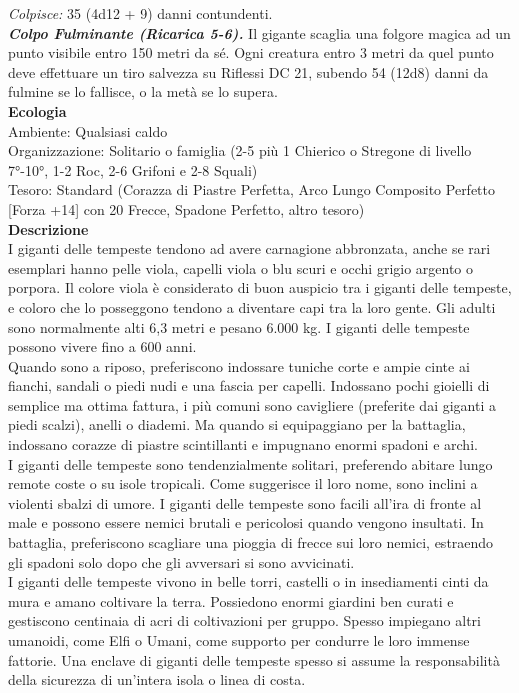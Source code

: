 \begin{multicols}{2}
\emph{Colpisce:} 35 (4d12 + 9) danni contundenti.\\
\emph{\textbf{Colpo Fulminante (Ricarica 5-6).}} Il gigante scaglia una folgore magica ad un punto visibile entro 150 metri da sé. Ogni creatura entro 3 metri da quel punto deve effettuare un tiro salvezza su Riflessi DC  21, subendo 54 (12d8) danni da fulmine se lo fallisce, o la metà se lo supera.\\
\textbf{Ecologia}\\
Ambiente: Qualsiasi caldo\\
Organizzazione: Solitario o famiglia (2-5 più 1 Chierico o Stregone di livello 7°-10°, 1-2 Roc, 2-6 Grifoni e 2-8 Squali)\\
Tesoro: Standard (Corazza di Piastre Perfetta, Arco Lungo Composito Perfetto [Forza +14] con 20 Frecce, Spadone Perfetto, altro tesoro)\\
\textbf{Descrizione}\\
I giganti delle tempeste tendono ad avere carnagione abbronzata, anche se rari esemplari hanno pelle viola, capelli viola o blu scuri e occhi grigio argento o porpora. Il colore viola è considerato di buon auspicio tra i giganti delle tempeste, e coloro che lo posseggono tendono a diventare capi tra la loro gente. Gli adulti sono normalmente alti 6,3 metri e pesano 6.000 kg. I giganti delle tempeste possono vivere fino a 600 anni.\\

Quando sono a riposo, preferiscono indossare tuniche corte e ampie cinte ai fianchi, sandali o piedi nudi e una fascia per capelli. Indossano pochi gioielli di semplice ma ottima fattura, i più comuni sono cavigliere (preferite dai giganti a piedi scalzi), anelli o diademi. Ma quando si equipaggiano per la battaglia, indossano corazze di piastre scintillanti e impugnano enormi spadoni e archi.\\

I giganti delle tempeste sono tendenzialmente solitari, preferendo abitare lungo remote coste o su isole tropicali. Come suggerisce il loro nome, sono inclini a violenti sbalzi di umore. I giganti delle tempeste sono facili all'ira di fronte al male e possono essere nemici brutali e pericolosi quando vengono insultati. In battaglia, preferiscono scagliare una pioggia di frecce sui loro nemici, estraendo gli spadoni solo dopo che gli avversari si sono avvicinati.\\

I giganti delle tempeste vivono in belle torri, castelli o in insediamenti cinti da mura e amano coltivare la terra. Possiedono enormi giardini ben curati e gestiscono centinaia di acri di coltivazioni per gruppo. Spesso impiegano altri umanoidi, come Elfi o Umani, come supporto per condurre le loro immense fattorie. Una enclave di giganti delle tempeste spesso si assume la responsabilità della sicurezza di un'intera isola o linea di costa.\\


\end{multicols}
